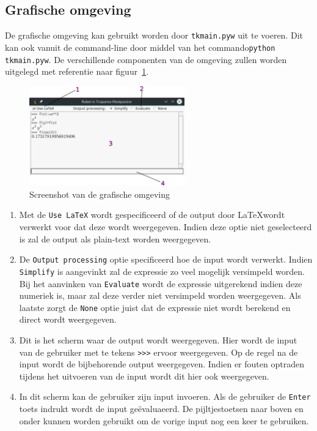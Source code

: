 \documentclass[a4paper]{article}
\begin{document}
\subsection{Grafische omgeving}
De grafische omgeving kan gebruikt worden door \texttt{tkmain.pyw} uit te voeren. Dit kan ook vanuit de command-line door middel van het commando\texttt{python tkmain.pyw}.  De verschillende componenten van de omgeving zullen worden uitgelegd met referentie naar figuur~\ref{fig:screenshot}.

\begin{figure}[!htb]
  \centering
  \includegraphics[width=0.6\textwidth]{screenshot.png}
  \caption{Screenshot van de grafische omgeving}
  \label{fig:screenshot}
\end{figure}

\begin{enumerate}
\item Met de \texttt{Use LaTeX} wordt gespecificeerd of de output door \LaTeX wordt verwerkt voor dat deze wordt weergegeven. Indien deze optie niet geselecteerd is zal de output als plain-text worden weergegeven.
\item De \texttt{Output processing} optie specificeerd hoe de input wordt verwerkt. Indien \texttt{Simplify} is aangevinkt zal de expressie zo veel mogelijk versimpeld worden. Bij het aanvinken van \texttt{Evaluate} wordt de expressie uitgerekend indien deze numeriek is, maar zal deze verder niet versimpeld worden weergegeven. Als laatste zorgt de \texttt{None} optie juist dat de expressie niet wordt berekend en direct wordt weergegeven.
\item Dit is het scherm waar de output wordt weergegeven. Hier wordt de input van de gebruiker met te tekens \texttt{>>>} ervoor weergegeven. Op de regel na de input wordt de bijbehorende output weergegeven. Indien er fouten optraden tijdens het uitvoeren van de input wordt dit hier ook weergegeven.
\item In dit scherm kan de gebruiker zijn input invoeren. Als de gebruiker de \texttt{Enter} toets indrukt wordt de input ge\"evaluaeerd. De pijltjestoetsen naar boven en onder kunnen worden gebruikt om de vorige input nog een keer te gebruiken.
\end{enumerate}
\end{document}
